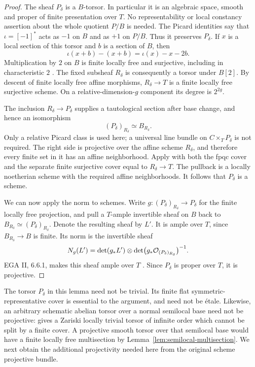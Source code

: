 \begin{proof}
The sheaf $P_\delta$ is a $B$-torsor. In particular it is an
algebraic space, smooth and proper of finite presentation over $T$.
No representability or local constancy assertion about the whole
quotient $P/B$ is needed. The Picard identities
\cite[\S\S3.1--3.2]{PR} say that
$\iota=[-1]^*$ acts as $-1$ on $B$ and as $+1$ on $P/B$.
Thus it preserves $P_\delta$. If $x$ is a local section of this
torsor and $b$ is a section of $B$, then
\[
 \iota(x+b)-(x+b)=\iota(x)-x-2b.
\]
Multiplication by $2$ on $B$ is finite locally free and surjective,
including in characteristic $2$
\cite[Corollary~4.6]{LaurentSchroer}.
The fixed subsheaf $R_\delta$ is consequently a torsor under
$B[2]$. By descent of finite locally free affine morphisms,
$R_\delta\to T$ is a finite locally free surjective scheme. On
a relative-dimension-$g$ component its degree is $2^{2g}$.

The inclusion $R_\delta\to P_\delta$ supplies a tautological
section after base change, and hence an isomorphism
\[
 (P_\delta)_{R_\delta}\simeq B_{R_\delta}.
\]
Only a relative Picard class is used here; a universal line bundle
on $C\times_TP_\delta$ is not required.
The right side is projective over the affine scheme $R_\delta$,
and therefore every finite set in it has an affine neighborhood.
Apply \cite[Theorem~4.2]{RaynaudDescent} with both the fpqc cover
and the separate finite surjective cover equal to
$R_\delta\to T$. The pullback is a locally noetherian scheme
with the required affine neighborhoods. It follows that
$P_\delta$ is a scheme.

We can now apply the norm to schemes. Write
$g:(P_\delta)_{R_\delta}\to P_\delta$ for the finite locally free
projection, and pull a $T$-ample invertible sheaf on $B$ back to
$B_{R_\delta}\simeq(P_\delta)_{R_\delta}$. Denote the resulting
sheaf by $L'$. It is ample over $T$, since $B_{R_\delta}\to B$ is
finite. Its norm is the invertible sheaf
\[
 N_g(L')=
 \det(g_*L')\otimes
 \det\bigl(g_*\mathcal O_{(P_\delta)_{R_\delta}}\bigr)^{-1}.
\]
EGA II, 6.6.1, makes this sheaf ample over $T$
\cite{EGA}. Since $P_\delta$ is proper over $T$, it is projective.
\end{proof}

The torsor $P_\delta$ in this lemma need not be trivial.
Its finite flat symmetric-representative cover is essential to the
argument, and need not be \'etale. Likewise, an arbitrary schematic
abelian torsor over a normal semilocal base need not be projective:
\cite[Example~6.1, p.~1574]{BhattAnnihilation} gives a Zariski
locally trivial torsor of infinite order which cannot be split by
a finite cover. A projective smooth torsor over that semilocal base
would have a finite locally free multisection by
Lemma~\ref{lem:semilocal-multisection}. We next obtain the
additional projectivity needed here from the original scheme
projective bundle.

